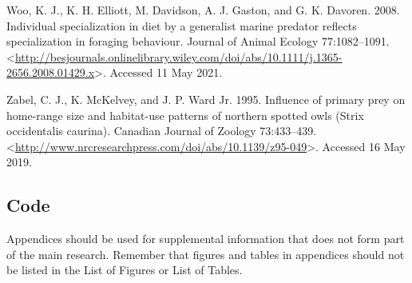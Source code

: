 \documentclass{sfuthesis}
\begin{document}
\leavevmode\hypertarget{ref-woo_individual_2008}{}%
Woo, K. J., K. H. Elliott, M. Davidson, A. J. Gaston, and G. K. Davoren. 2008. Individual specialization in diet by a generalist marine predator reflects specialization in foraging behaviour. Journal of Animal Ecology 77:1082--1091. \textless{}\url{http://besjournals.onlinelibrary.wiley.com/doi/abs/10.1111/j.1365-2656.2008.01429.x}\textgreater. Accessed 11 May 2021.

\leavevmode\hypertarget{ref-zabel_influence_1995}{}%
Zabel, C. J., K. McKelvey, and J. P. Ward Jr. 1995. Influence of primary prey on home-range size and habitat-use patterns of northern spotted owls (Strix occidentalis caurina). Canadian Journal of Zoology 73:433--439. \textless{}\url{http://www.nrcresearchpress.com/doi/abs/10.1139/z95-049}\textgreater. Accessed 16 May 2019.



%
%
%
%
%

\backmatter%
	
	

\begin{appendices} %
\chapter{Code}

Appendices should be used for supplemental information that does not form part of the main research. Remember that figures and tables in appendices should not be listed in the List of Figures or List of Tables.

\end{appendices}
\end{document}
